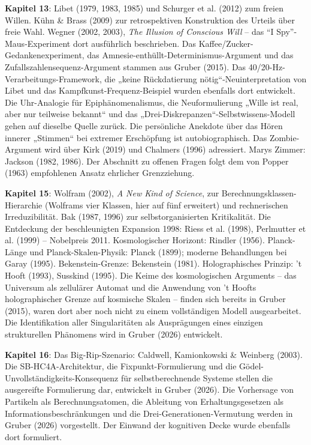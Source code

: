 \documentclass[11pt, twoside, openright]{book}
\begin{document}
\textbf{Kapitel 13}: Libet (1979, 1983, 1985) und Schurger et al. (2012) zum freien Willen. Kühn \& Brass (2009) zur retrospektiven Konstruktion des Urteils über freie Wahl. Wegner (2002, 2003), \textit{The Illusion of Conscious Will} -- das ``I Spy''-Maus-Experiment dort ausführlich beschrieben. Das Kaffee/Zucker-Gedankenexperiment, das Amnesie-enthüllt-Determinismus-Argument und das Zufallszahlensequenz-Argument stammen aus Gruber (2015). Das 40/20-Hz-Verarbeitungs-Framework, die „keine Rückdatierung nötig“-Neuinterpretation von Libet und das Kampfkunst-Frequenz-Beispiel wurden ebenfalls dort entwickelt. Die Uhr-Analogie für Epiphänomenalismus, die Neuformulierung „Wille ist real, aber nur teilweise bekannt“ und das „Drei-Diskrepanzen“-Selbstwissens-Modell gehen auf dieselbe Quelle zurück. Die persönliche Anekdote über das Hören innerer „Stimmen“ bei extremer Erschöpfung ist autobiographisch. Das Zombie-Argument wird über Kirk (2019) und Chalmers (1996) adressiert. Marys Zimmer: Jackson (1982, 1986). Der Abschnitt zu offenen Fragen folgt dem von Popper (1963) empfohlenen Ansatz ehrlicher Grenzziehung.

\textbf{Kapitel 15}: Wolfram (2002), \textit{A New Kind of Science}, zur Berechnungsklassen-Hierarchie (Wolframs vier Klassen, hier auf fünf erweitert) und rechnerischen Irreduzibilität. Bak (1987, 1996) zur selbstorganisierten Kritikalität. Die Entdeckung der beschleunigten Expansion 1998: Riess et al. (1998), Perlmutter et al. (1999) -- Nobelpreis 2011. Kosmologischer Horizont: Rindler (1956). Planck-Länge und Planck-Skalen-Physik: Planck (1899); moderne Behandlungen bei Garay (1995). Bekenstein-Grenze: Bekenstein (1981). Holographisches Prinzip: 't Hooft (1993), Susskind (1995). Die Keime des kosmologischen Arguments -- das Universum als zellulärer Automat und die Anwendung von 't Hoofts holographischer Grenze auf kosmische Skalen -- finden sich bereits in Gruber (2015), waren dort aber noch nicht zu einem vollständigen Modell ausgearbeitet. Die Identifikation aller Singularitäten als Ausprägungen eines einzigen strukturellen Phänomens wird in Gruber (2026) entwickelt.

\textbf{Kapitel 16}: Das Big-Rip-Szenario: Caldwell, Kamionkowski \& Weinberg (2003). Die SB-HC4A-Architektur, die Fixpunkt-Formulierung und die Gödel-Unvollständigkeits-Konsequenz für selbstberechnende Systeme stellen die ausgereifte Formulierung dar, entwickelt in Gruber (2026). Die Vorhersage von Partikeln als Berechnungsatomen, die Ableitung von Erhaltungsgesetzen als Informationsbeschränkungen und die Drei-Generationen-Vermutung werden in Gruber (2026) vorgestellt. Der Einwand der kognitiven Decke wurde ebenfalls dort formuliert.
\end{document}
